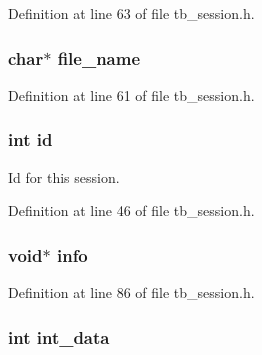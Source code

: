 Definition at line 63 of file tb\-\_\-session.\-h.

\hypertarget{structtb__session__t_a8505c513bc640d1f69e5f76fb32b24a8}{
\subsubsection[{file\-\_\-name}]{\setlength{\rightskip}{0pt plus 5cm}char$\ast$ file\-\_\-name}}\label{structtb__session__t_a8505c513bc640d1f69e5f76fb32b24a8}


Definition at line 61 of file tb\-\_\-session.\-h.

\hypertarget{structtb__session__t_a7441ef0865bcb3db9b8064dd7375c1ea}{
\subsubsection[{id}]{\setlength{\rightskip}{0pt plus 5cm}int id}}\label{structtb__session__t_a7441ef0865bcb3db9b8064dd7375c1ea}


Id for this session. 



Definition at line 46 of file tb\-\_\-session.\-h.

\hypertarget{structtb__session__t_acb1df3a0f703b05bc4971f79cabe2597}{
\subsubsection[{info}]{\setlength{\rightskip}{0pt plus 5cm}void$\ast$ info}}\label{structtb__session__t_acb1df3a0f703b05bc4971f79cabe2597}


Definition at line 86 of file tb\-\_\-session.\-h.

\hypertarget{structtb__session__t_adf89a25c6c2cefbabf86ff4e7931032e}{
\subsubsection[{int\-\_\-data}]{\setlength{\rightskip}{0pt plus 5cm}int int\-\_\-data}}\label{structtb__session__t_adf89a25c6c2cefbabf86ff4e7931032e}


